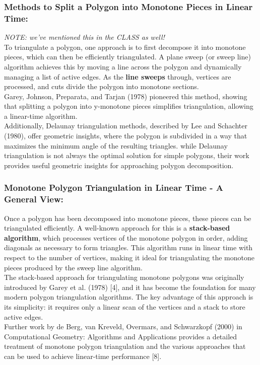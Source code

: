 \documentclass{article}
\begin{document}
\subsubsection*{Methods to Split a Polygon into Monotone Pieces in Linear Time: }
\textit{NOTE: we've mentioned this in the CLASS as well!}
\\
To triangulate a polygon, one approach is to first decompose it into monotone pieces, which can then be efficiently triangulated. A plane sweep (or sweep line) algorithm achieves this by moving a line across the polygon and dynamically managing a list of active edges. As the \textbf{line sweeps} through, vertices are processed, and cuts divide the polygon into monotone sections.
\\
Garey, Johnson, Preparata, and Tarjan (1978) pioneered this method, showing that splitting a polygon into y-monotone pieces simplifies triangulation, allowing a linear-time algorithm. 
\\
Additionally, Delaunay triangulation methods, described by Lee and Schachter (1980), offer geometric insights, where the polygon is subdivided in a way that maximizes the minimum angle of the resulting triangles. while Delaunay triangulation is not always the optimal solution for simple polygons, their work provides useful geometric insights for approaching polygon decomposition.

\subsubsection*{Monotone Polygon Triangulation in Linear Time - A General View: }
Once a polygon has been decomposed into monotone pieces, these pieces can be triangulated efficiently. A well-known approach for this is a \textbf{stack-based algorithm}, which processes vertices of the monotone polygon in order, adding diagonals as necessary to form triangles. This algorithm runs in linear time with respect to the number of vertices, making it ideal for triangulating the monotone pieces produced by the sweep line algorithm.
\\
The stack-based approach for triangulating monotone polygons was originally introduced by Garey et al. (1978) [4], and it has become the foundation for many modern polygon triangulation algorithms. The key advantage of this approach is its simplicity: it requires only a linear scan of the vertices and a stack to store active edges.
\\
Further work by de Berg, van Kreveld, Overmars, and Schwarzkopf (2000) in Computational Geometry: Algorithms and Applications provides a detailed treatment of monotone polygon triangulation and the various approaches that can be used to achieve linear-time performance [8].
\end{document}
